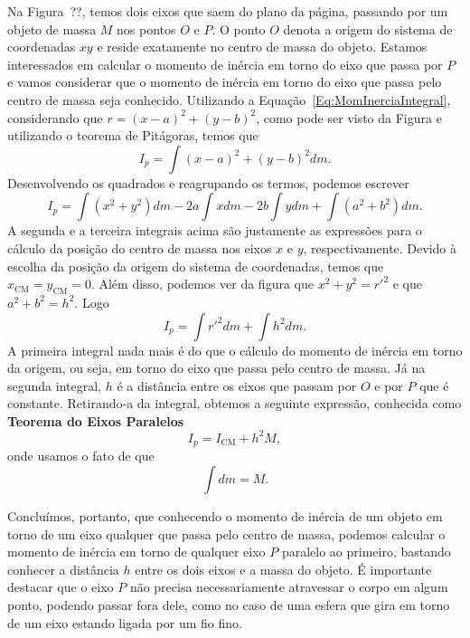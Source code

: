 
Na Figura~??, temos dois eixos que saem do plano da página, passando por um objeto de massa $M$ nos pontos $O$ e $P$. O ponto $O$ denota a origem do sistema de coordenadas $xy$ e reside exatamente no centro de massa do objeto. Estamos interessados em calcular o momento de inércia em torno do eixo que passa por $P$ e vamos considerar que o momento de inércia em torno do eixo que passa pelo centro de massa seja conhecido. Utilizando a Equação~\ref{Eq:MomInerciaIntegral}, considerando que $r = (x-a)^2 + (y-b)^2$, como pode ser visto da Figura e utilizando o teorema de Pitágoras, temos que
\begin{equation}
	I_p = \int (x-a)^2 + (y-b)^2 dm.
\end{equation}
%
Desenvolvendo os quadrados e reagrupando os termos, podemos escrever
\begin{equation}
	I_p = \int (x^2 + y^2) dm - 2a \int x dm - 2b \int y dm + \int (a^2 + b^2) dm.
\end{equation}
%
A segunda e a terceira integrais acima são justamente as expressões para o cálculo da posição do centro de massa nos eixos $x$ e $y$, respectivamente. Devido à escolha da posição da origem do sistema de coordenadas, temos que $x_{\textrm{CM}} = y_{\textrm{CM}} = 0$. Além disso, podemos ver da figura que $x^2 + y^2 = r'^2$ e que $a^2 + b^2 = h^2$. Logo
\begin{equation}
	I_p = \int r'^2 dm + \int h^2 dm.
\end{equation}
%
A primeira integral nada mais é do que o cálculo do momento de inércia em torno da origem, ou seja, em torno do eixo que passa pelo centro de massa. Já na segunda integral, $h$ é a distância entre os eixos que passam por $O$ e por $P$ que é constante. Retirando-a da integral, obtemos a seguinte expressão, conhecida como \textbf{Teorema do Eixos Paralelos}
\begin{equation}\label{Eq:TeoremaEixosParalelos}
	I_p = I_{\textrm{CM}} + h^2 M,
\end{equation}
%
onde usamos o fato de que
\begin{equation}
	\int dm = M.
\end{equation}

Concluímos, portanto, que conhecendo o momento de inércia de um objeto em torno de um eixo qualquer que passa pelo centro de massa, podemos calcular o momento de inércia em torno de qualquer eixo $P$ paralelo ao primeiro, bastando conhecer a distância $h$ entre os dois eixos e a massa do objeto. É importante destacar que o eixo $P$ não precisa necessariamente atravessar o corpo em algum ponto, podendo passar fora dele, como no caso de uma esfera que gira em torno de um eixo estando ligada por um fio fino. 

